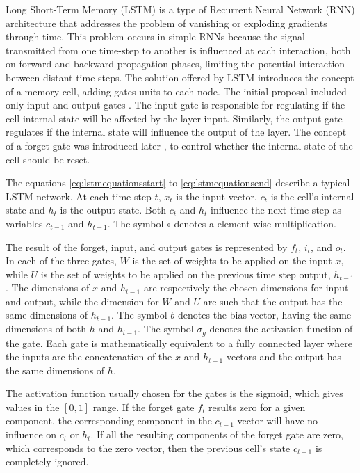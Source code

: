Long Short-Term Memory\cite{hochreiter_long_1997} (LSTM) is a type of Recurrent Neural Network (RNN) architecture that addresses the problem of vanishing or exploding gradients through time. This problem occurs in simple RNNs because the signal transmitted from one time-step to another is influenced at each interaction, both on forward and backward propagation phases, limiting the potential interaction between distant time-steps. The solution offered by LSTM introduces the concept of a memory cell, adding gates units to each node. The initial proposal included only input and output gates \cite{hochreiter_long_1997}.
The input gate is responsible for regulating if the cell internal state will be affected by the layer input. Similarly, the output gate regulates if the internal state will influence the output of the layer. The concept of a forget gate was introduced later \cite{gers_learning_1999}, to control whether the internal state of the cell should be reset.

The equations \eqref{eq:lstmequationsstart} to \eqref{eq:lstmequationsend} describe a typical LSTM network. At each time step $t$, $x_t$ is the input vector, $c_t$ is the cell's internal state and $h_t$ is the output state. Both $c_t$ and $h_t$ influence the next time step as variables $c_{t-1}$ and $h_{t-1}$. The symbol $\circ$ denotes a element wise multiplication.


The result of the forget, input, and output gates is represented by $f_t$, $i_t$, and $o_t$.
In each of the three gates, $W$ is the set of weights to be applied on the input $x$, while $U$ is the set of weights to be applied on the previous time step output, $h_{t-1}$. 
The dimensions of $x$ and $h_{t-1}$ are respectively the chosen dimensions for input and output, while the dimension for $W$ and $U$ are such that the output has the same dimensions of $h_{t-1}$.  The symbol $b$ denotes the bias vector, having the same dimensions of both $h$ and $h_{t-1}$. The symbol $\sigma_g$ denotes the activation function of the gate. Each gate is mathematically equivalent to a fully connected layer where the inputs are the concatenation of the $x$ and $h_{t-1}$ vectors and the output has the same dimensions of $h$.

The activation function usually chosen for the gates is the sigmoid, which gives values in the $[0,1]$ range. If the forget gate $f_t$ results zero for a given component, the corresponding component in the $c_{t-1}$ vector will have no influence on $c_t$ or $h_t$. If all the resulting components of the forget gate are zero, which corresponds to the zero vector, then the previous cell's state $c_{t-1}$ is completely ignored.

